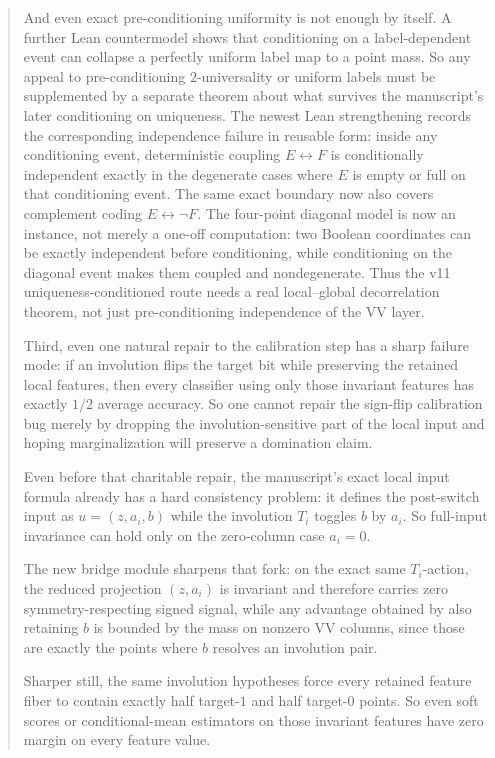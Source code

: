 \documentclass[11pt]{article}
\theoremstyle{remark}
\begin{document}
\begin{abstract}
And even exact pre-conditioning uniformity is not enough by itself.  A further Lean countermodel
shows that conditioning on a label-dependent event can collapse a perfectly uniform label map to a
point mass.  So any appeal to pre-conditioning \(2\)-universality or uniform labels must be
supplemented by a separate theorem about what survives the manuscript's later conditioning on
uniqueness.
The newest Lean strengthening records the corresponding independence failure in reusable form:
inside any conditioning event, deterministic coupling \(E\leftrightarrow F\) is conditionally
independent exactly in the degenerate cases where \(E\) is empty or full on that conditioning
event.  The same exact boundary now also covers complement coding \(E\leftrightarrow\neg F\).
The four-point diagonal model is now an instance, not merely a one-off computation: two Boolean
coordinates can be exactly independent before conditioning, while conditioning on the diagonal
event makes them coupled and nondegenerate.  Thus the v11 uniqueness-conditioned route needs a real
local--global decorrelation theorem, not just pre-conditioning independence of the VV layer.

Third, even one natural repair to the calibration step has a sharp failure mode: if an
involution flips the target bit while preserving the retained local features, then every
classifier using only those invariant features has exactly \(1/2\) average accuracy.  So one
cannot repair the sign-flip calibration bug merely by dropping the involution-sensitive part of
the local input and hoping marginalization will preserve a domination claim.

Even before that charitable repair, the manuscript's exact local input formula already has a hard
consistency problem: it defines the post-switch input as \(u=(z,a_i,b)\) while the involution
\(T_i\) toggles \(b\) by \(a_i\).  So full-input invariance can hold only on the zero-column case
\(a_i=0\).

The new bridge module sharpens that fork: on the exact same \(T_i\)-action, the reduced projection
\((z,a_i)\) is invariant and therefore carries zero symmetry-respecting signed signal, while any
advantage obtained by also retaining \(b\) is bounded by the mass on nonzero VV columns, since
those are exactly the points where \(b\) resolves an involution pair.

Sharper still, the same involution hypotheses force every retained feature fiber to contain
exactly half target-\(1\) and half target-\(0\) points.  So even soft scores or conditional-mean
estimators on those invariant features have zero margin on every feature value.


\end{abstract}
\end{document}

